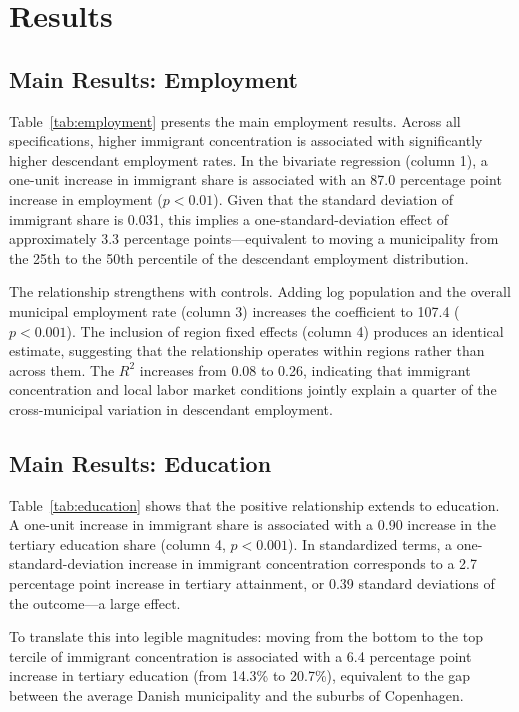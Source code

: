 \documentclass[12pt]{article}
\begin{document}
\section{Results}

\subsection{Main Results: Employment}



Table~\ref{tab:employment} presents the main employment results. Across all specifications, higher immigrant concentration is associated with significantly higher descendant employment rates. In the bivariate regression (column 1), a one-unit increase in immigrant share is associated with an 87.0 percentage point increase in employment ($p < 0.01$). Given that the standard deviation of immigrant share is 0.031, this implies a one-standard-deviation effect of approximately 3.3 percentage points---equivalent to moving a municipality from the 25th to the 50th percentile of the descendant employment distribution.

The relationship strengthens with controls. Adding log population and the overall municipal employment rate (column 3) increases the coefficient to 107.4 ($p < 0.001$). The inclusion of region fixed effects (column 4) produces an identical estimate, suggesting that the relationship operates within regions rather than across them. The $R^2$ increases from 0.08 to 0.26, indicating that immigrant concentration and local labor market conditions jointly explain a quarter of the cross-municipal variation in descendant employment.

\subsection{Main Results: Education}



Table~\ref{tab:education} shows that the positive relationship extends to education. A one-unit increase in immigrant share is associated with a 0.90 increase in the tertiary education share (column 4, $p < 0.001$). In standardized terms, a one-standard-deviation increase in immigrant concentration corresponds to a 2.7 percentage point increase in tertiary attainment, or 0.39 standard deviations of the outcome---a large effect.

To translate this into legible magnitudes: moving from the bottom to the top tercile of immigrant concentration is associated with a 6.4 percentage point increase in tertiary education (from 14.3\% to 20.7\%), equivalent to the gap between the average Danish municipality and the suburbs of Copenhagen.
\end{document}

